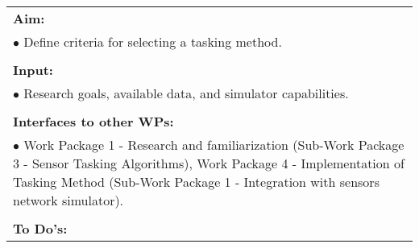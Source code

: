 \begin{table}[!h]
\begin{center}
\begin{tabular}{|p{35mm}||p{55mm}|p{50mm}||p{40mm}|}
      \hline\hline
      \multicolumn{4}{|p{150mm}|}{\textbf{Aim:}}                                                                                                                                                            \\
      \multicolumn{4}{|p{150mm}|}{$\bullet$ Define criteria for selecting a tasking method.}                                                   \\
      \multicolumn{4}{|p{150mm}|}{}                                                                                                                                                                           \\
      \multicolumn{4}{|p{150mm}|}{\textbf{Input:}}                                                                                                                                                            \\
      \multicolumn{4}{|p{150mm}|}{$\bullet$  Research goals, available data, and simulator capabilities.}                                                                                                                                 \\
      \multicolumn{4}{|p{150mm}|}{}                                                                                                                                                                           \\
      \multicolumn{4}{|p{150mm}|}{\textbf{Interfaces to other WPs:}}                                                                                                                                    \\
      \multicolumn{4}{|p{150mm}|}{$\bullet$ Work Package 1 - Research and familiarization (Sub-Work Package 3 - Sensor Tasking Algorithms), Work Package 4 - Implementation of Tasking Method (Sub-Work Package 1 - Integration with sensors network simulator).}                                                                                              \\
      \multicolumn{4}{|p{150mm}|}{}                                                                                                                                                                           \\
      \multicolumn{4}{|p{150mm}|}{\textbf{To Do's:}}                                                                                                                                                         \\

\end{tabular}
\end{center}
\end{table}

